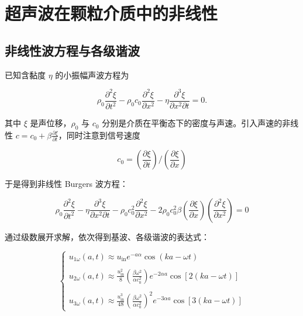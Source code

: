 \section{超声波在颗粒介质中的非线性}

\subsection{非线性波方程与各级谐波}

已知含黏度 $\eta$ 的小振幅声波方程为

\begin{equation}
  \rho_{0}\frac{\partial^{2}\xi}{\partial t^{2}} - \rho_{0}c_{0}\frac{\partial^{2}\xi}{\partial x^{2}} - \eta\frac{\partial^{3}\xi}{\partial x^{2}\partial t} = 0.
\end{equation}

其中 $\xi$ 是声位移，$\rho_{0}$ 与 $c_{0}$ 分别是介质在平衡态下的密度与声速。引入声速的非线性 $c = c_{0} + \beta\frac{\partial\xi}{\partial t}$，同时注意到信号速度

\begin{equation}
  c_{0} = \left(\frac{\partial \xi}{\partial t}\right)/\left(\frac{\partial\xi}{\partial x}\right)
\end{equation}

于是得到非线性 Burgers 波方程：


\begin{equation}
  \rho_{0}\frac{\partial^{2}\xi}{\partial t^{2}} - \eta\frac{\partial^{3}\xi}{\partial x^{2}\partial t} - \rho_{0}c_{0}^{2}\frac{\partial^{2}\xi}{\partial x^{2}} - 2\rho_{0}c_{0}^{2}\beta\left(\frac{\partial \xi}{\partial x}\right)\left(\frac{\partial^{2} \xi}{\partial x^{2}}\right) = 0
\end{equation}

通过级数展开求解，依次得到基波、各级谐波的表达式：

\begin{equation}
  \begin{cases}
    u_{1\omega}(a,t) \approx u_{\text{in}}e^{-a\alpha}\cos{(ka-\omega t)}\\
    \\
    u_{2\omega}(a,t) \approx \frac{u_{\text{in}}^{2}}{8}\left(\frac{\beta\omega^{2}}{\alpha c_{0}^{2}}\right)e^{-2\alpha a}\cos{[2(ka-\omega t)]}\\
    \\
    u_{3\omega}(a,t) \approx \frac{u_{\text{in}}^{3}}{48}\left(\frac{\beta\omega^{2}}{\alpha c_{0}^{2}}\right)^{2}e^{-3\alpha a}\cos{[3(ka-\omega t)]}
    \end{cases}
\end{equation}

